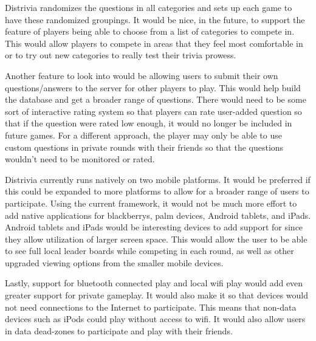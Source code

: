 \documentclass{dependencies/acm_proc_article-sp}
\begin{document}
Distrivia randomizes the questions in all categories and sets up each game to have these randomized groupings.
It would be nice, in the future, to support the feature of players being able to choose from a list of categories to compete in.
This would allow players to compete in areas that they feel most comfortable in or to try out new categories to really test their trivia prowess.

Another feature to look into would be allowing users to submit their own questions/answers to the server for other players to play.
This would help build the database and get a broader range of questions.
There would need to be some sort of interactive rating system so that players can rate user-added question so that if the question were rated low enough, it would no longer be included in future games.
For a different approach, the player may only be able to use custom questions in private rounds with their friends so that the questions wouldn't need to be monitored or rated.

Distrivia currently runs natively on two mobile platforms.
It would be preferred if this could be expanded to more platforms to allow for a broader range of users to participate.
Using the current framework, it would not be much more effort to add native applications for blackberrys, palm devices, Android tablets, and iPads.
Android tablets and iPads would be interesting devices to add support for since they allow utilization of larger screen space.
This would allow the user to be able to see full local leader boards while competing in each round, as well as other upgraded viewing options from the smaller mobile devices.

Lastly, support for bluetooth connected play and local wifi play would add even greater support for private gameplay. 
It would also make it so that devices would not need connections to the Internet to participate.
This means that non-data devices such as iPods could play without access to wifi.
It would also allow users in data dead-zones to participate and play with their friends.

\newpage
%

%
%
\balancecolumns
\end{document}
